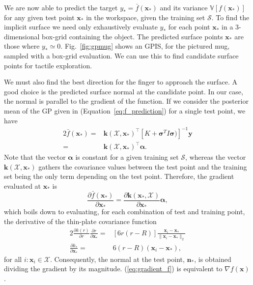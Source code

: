 We are now able to predict the target $y_* = \bar{f}(\mathbf{x}_*)$ and its variance $\mathbb{V}[f(\mathbf{x}_*)]$ for any given test point $\mathbf{x}_*$ in the workspace, %
given the training set $\mathcal{S}$. To find the implicit surface we need only exhaustively evaluate $y_*$ for each point $\mathbf{x}_*$ in a $3$-dimensional box-grid containing the object. The predicted surface points $\mathbf{x}_*$ are those where $y_* \simeq 0$. 
Fig.~\ref{fig:gpmug} shows an GPIS, for the pictured mug, sampled with a box-grid evaluation. We can use this to find candidate surface points for tactile exploration. 

We must also find the best direction for the finger to approach the surface. A good choice is the predicted surface normal at the candidate point. In our case, the normal is parallel to the gradient of the function. If we consider the posterior mean of the GP given in (Equation~\ref{eq:f_prediction}) for a single test point, we have
\begin{alignat}{2}
\bar{f}(\mathbf{x}_*) = & \mathbf{k}(\mathcal{X},\mathbf{x}_*)^\top [K + \boldsymbol{\sigma}^{T} I \boldsymbol{\sigma})]^{-1}\mathbf{y} \nonumber \\ = & \mathbf{k}(\mathcal{X},\mathbf{x}_*)^\top \boldsymbol{\alpha}.
\end{alignat}
Note that the vector $\boldsymbol{\alpha}$ is constant for a given training set $\mathcal{S}$, whereas the vector $\mathbf{k}(\mathcal{X},\mathbf{x}_*)$ gathers the covariance values between the test point and the training set being the only term depending on the test point. Therefore, the  gradient evaluated at $\mathbf{x}_*$ is
\begin{equation}
 \frac{\partial \bar{f}(\mathbf{x}_*)}{\partial \mathbf{x}_*} = \frac{\partial \mathbf{k}(\mathbf{x}_*,\mathcal{X})}{\partial \mathbf{x}_*} \boldsymbol{\alpha}, \label{eq:gradient_f}
\end{equation}
which boils down to evaluating, for each combination of test and training point, the derivative of the thin-plate covariance function
\begin{alignat}{2}
  \frac{\partial k(r)}{ \partial r} \frac{\partial r}{ \partial \mathbf{x}_*} = & [6r (r - R)] \frac{\mathbf{x}_i - \mathbf{x}_*}{\| \mathbf{x}_i - \mathbf{x}_* \|_2} \nonumber \\ \frac{\partial k_*}{ \partial \mathbf{x}_*} = & 6(r - R) (\mathbf{x}_i - \mathbf{x}_*),
\end{alignat}
for all $i : \mathbf{x}_i \in \mathcal{X}$. Consequently, the normal at the test point, $\mathbf{n}_*$, is obtained dividing the gradient by its magnitude. (\ref{eq:gradient_f}) is equivalent to $\nabla f(\mathbf{x})$.

